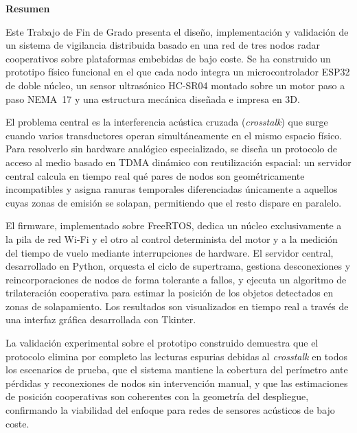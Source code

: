 
{}

\begin{flushleft}
{\Huge \textbf{\sffamily Resumen}}
\end{flushleft}
\vspace{0.5cm}

Este Trabajo de Fin de Grado presenta el diseño, implementación y validación de un sistema de vigilancia distribuida basado en una red de tres nodos radar cooperativos sobre plataformas embebidas de bajo coste. Se ha construido un prototipo físico funcional en el que cada nodo integra un microcontrolador ESP32 de doble núcleo, un sensor ultrasónico HC-SR04 montado sobre un motor paso a paso NEMA~17 y una estructura mecánica diseñada e impresa en 3D.

El problema central es la interferencia acústica cruzada (\textit{crosstalk}) que surge cuando varios transductores operan simultáneamente en el mismo espacio físico. Para resolverlo sin hardware analógico especializado, se diseña un protocolo de acceso al medio basado en TDMA dinámico con reutilización espacial: un servidor central calcula en tiempo real qué pares de nodos son geométricamente incompatibles y asigna ranuras temporales diferenciadas únicamente a aquellos cuyas zonas de emisión se solapan, permitiendo que el resto dispare en paralelo.

El firmware, implementado sobre FreeRTOS, dedica un núcleo exclusivamente a la pila de red Wi-Fi y el otro al control determinista del motor y a la medición del tiempo de vuelo mediante interrupciones de hardware. El servidor central, desarrollado en Python, orquesta el ciclo de supertrama, gestiona desconexiones y reincorporaciones de nodos de forma tolerante a fallos, y ejecuta un algoritmo de trilateración cooperativa para estimar la posición de los objetos detectados en zonas de solapamiento. Los resultados son visualizados en tiempo real a través de una interfaz gráfica desarrollada con Tkinter.

La validación experimental sobre el prototipo construido demuestra que el protocolo elimina por completo las lecturas espurias debidas al \textit{crosstalk} en todos los escenarios de prueba, que el sistema mantiene la cobertura del perímetro ante pérdidas y reconexiones de nodos sin intervención manual, y que las estimaciones de posición cooperativas son coherentes con la geometría del despliegue, confirmando la viabilidad del enfoque para redes de sensores acústicos de bajo coste.

